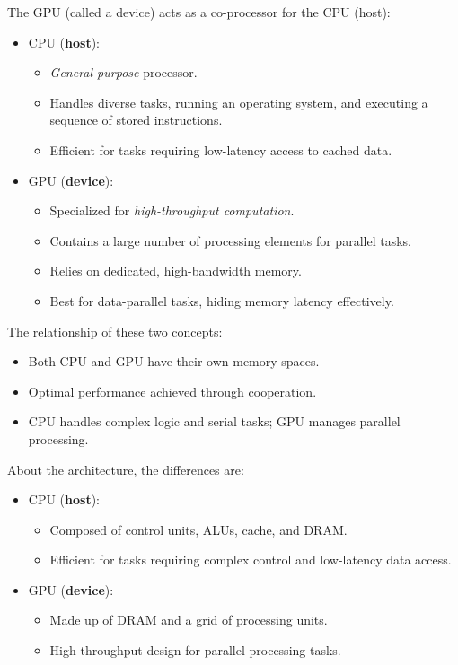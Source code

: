 \highspace
The GPU (called a device) acts as a co-processor for the CPU (host):
\begin{itemize}
    \item CPU (\textbf{host}):
    \begin{itemize}
        \item \emph{General-purpose} processor.
        \item Handles diverse tasks, running an operating system, and executing a sequence of stored instructions.
        \item Efficient for tasks requiring low-latency access to cached data.
    \end{itemize}

    \item GPU (\textbf{device}):
    \begin{itemize}
        \item Specialized for \emph{high-throughput computation}.
        \item Contains a large number of processing elements for parallel tasks.
        \item Relies on dedicated, high-bandwidth memory.
        \item Best for data-parallel tasks, hiding memory latency effectively.
    \end{itemize}
\end{itemize}
The relationship of these two concepts:
\begin{itemize}
    \item Both CPU and GPU have their own memory spaces.
    \item Optimal performance achieved through cooperation.
    \item CPU handles complex logic and serial tasks; GPU manages parallel processing.
\end{itemize}
About the architecture, the differences are:
\begin{itemize}
    \item CPU (\textbf{host}):
    \begin{itemize}
        \item Composed of control units, ALUs, cache, and DRAM.
        \item Efficient for tasks requiring complex control and low-latency data access.
    \end{itemize}

    \item GPU (\textbf{device}):
    \begin{itemize}
        \item Made up of DRAM and a grid of processing units.
        \item High-throughput design for parallel processing tasks.
    \end{itemize}
\end{itemize}

